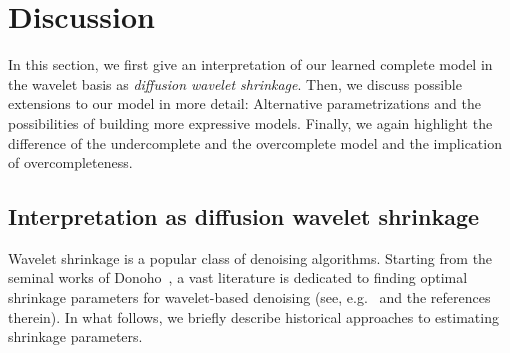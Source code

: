 \section{Discussion}%
\label{sec:discussion pogmdm}
In this section, we first give an interpretation of our learned complete model in the wavelet basis as \emph{diffusion wavelet shrinkage}.
Then, we discuss possible extensions to our model in more detail:
Alternative parametrizations and the possibilities of building more expressive models.
Finally, we again highlight the difference of the undercomplete and the overcomplete model and the implication of overcompleteness.
\subsection{Interpretation as diffusion wavelet shrinkage}
Wavelet shrinkage is a popular class of denoising algorithms.
Starting from the seminal works of Donoho~\cite{donoho_denoising_1995,donoho_adapting_1995,donoho_ideal_1994}, a vast literature is dedicated to finding optimal shrinkage parameters for wavelet-based denoising (see, e.g.\ \cite{chambolle_nonlinear_1998,chipman_adaptive_1997,clyde_multiple_1998,crouse_wavelet-based_1998,JANSEN199733,simoncelli_noise_1996} and the references therein).
In what follows, we briefly describe  historical approaches to estimating shrinkage parameters.

